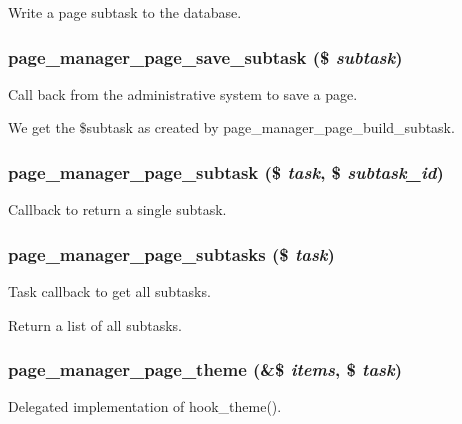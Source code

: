 \label{page_8inc_a2201f36620dbaa3f8a3a44b69870c91c}
Write a page subtask to the database. \hypertarget{page_8inc_a86005bf57efc31c24e501a4ac8a1b9d6}{
\subsubsection[{page\_\-manager\_\-page\_\-save\_\-subtask}]{\setlength{\rightskip}{0pt plus 5cm}page\_\-manager\_\-page\_\-save\_\-subtask (\$ {\em subtask})}}
\label{page_8inc_a86005bf57efc31c24e501a4ac8a1b9d6}
Call back from the administrative system to save a page.

We get the \$subtask as created by page\_\-manager\_\-page\_\-build\_\-subtask. \hypertarget{page_8inc_a428528644ba98663d068f76e2112da20}{
\subsubsection[{page\_\-manager\_\-page\_\-subtask}]{\setlength{\rightskip}{0pt plus 5cm}page\_\-manager\_\-page\_\-subtask (\$ {\em task}, \/  \$ {\em subtask\_\-id})}}
\label{page_8inc_a428528644ba98663d068f76e2112da20}
Callback to return a single subtask. \hypertarget{page_8inc_a2cfdc726207781912bf8e66d1f2d79e6}{
\subsubsection[{page\_\-manager\_\-page\_\-subtasks}]{\setlength{\rightskip}{0pt plus 5cm}page\_\-manager\_\-page\_\-subtasks (\$ {\em task})}}
\label{page_8inc_a2cfdc726207781912bf8e66d1f2d79e6}
Task callback to get all subtasks.

Return a list of all subtasks. \hypertarget{page_8inc_a2d83630a85dcb6a388396698a92b65d6}{
\subsubsection[{page\_\-manager\_\-page\_\-theme}]{\setlength{\rightskip}{0pt plus 5cm}page\_\-manager\_\-page\_\-theme (\&\$ {\em items}, \/  \$ {\em task})}}
\label{page_8inc_a2d83630a85dcb6a388396698a92b65d6}
Delegated implementation of hook\_\-theme(). 